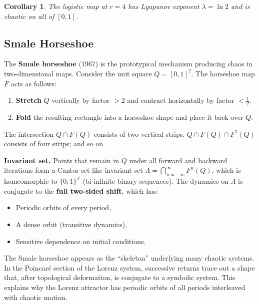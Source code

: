 \documentclass[11pt,letterpaper]{article}
\theoremstyle{definition}
\theoremstyle{plain}
\newtheorem{corollary}[theorem]{Corollary}
\theoremstyle{remark}
\begin{document}
\begin{corollary}
The logistic map at $r=4$ has Lyapunov exponent $\lambda = \ln 2$ and
is chaotic on all of $[0,1]$.
\end{corollary}

\subsection{Smale Horseshoe}

The \textbf{Smale horseshoe} (1967) is the prototypical mechanism
producing chaos in two-dimensional maps.  Consider the unit square
$Q = [0,1]^2$.  The horseshoe map $F$ acts as follows:
\begin{enumerate}[leftmargin=2em]
  \item \textbf{Stretch} $Q$ vertically by factor $>2$ and contract
    horizontally by factor $<\tfrac{1}{2}$.
  \item \textbf{Fold} the resulting rectangle into a horseshoe shape
    and place it back over $Q$.
\end{enumerate}
The intersection $Q \cap F(Q)$ consists of two vertical strips.
$Q \cap F(Q) \cap F^2(Q)$ consists of four strips; and so on.

\textbf{Invariant set.}  Points that remain in $Q$ under all forward
and backward iterations form a Cantor-set-like invariant set
$\Lambda = \bigcap_{n=-\infty}^{\infty} F^n(Q)$, which is homeomorphic
to $\{0,1\}^{\mathbb{Z}}$ (bi-infinite binary sequences).  The dynamics
on $\Lambda$ is conjugate to the \textbf{full two-sided shift}, which
has:
\begin{itemize}[leftmargin=2em]
  \item Periodic orbits of every period,
  \item A dense orbit (transitive dynamics),
  \item Sensitive dependence on initial conditions.
\end{itemize}

\begin{physicalnote}
The Smale horseshoe appears as the ``skeleton'' underlying many chaotic
systems.  In the Poincar\'e section of the Lorenz system, successive
returns trace out a shape that, after topological deformation, is
conjugate to a symbolic system.  This explains why the Lorenz attractor
has periodic orbits of all periods interleaved with chaotic motion.
\end{physicalnote}

\end{document}
